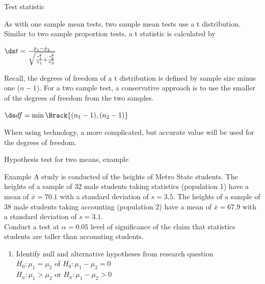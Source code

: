 \documentclass[xcolor=table, handout]{beamer}
\begin{document}
\begin{frame}{Test statistic}
\begin{block}{}
\large
As with one sample mean tests, two sample mean tests use a t distribution. Similar to two sample proportion tests, a t statistic  is calculated by\\
\medskip
{\centering $\ds t = \frac {\bar x_1 - \bar x_2}{\sqrt{\frac{s_1^2}{n_1} + \frac{s_2^2}{n_2}}}$ \par}
\medskip\pause
Recall, the degrees of freedom of a t distribution is defined by sample size minus one ($n-1$). For a two sample test, a conservative approach is to use the smaller of the degrees of freedom from the two samples.\\
\medskip
{\centering $\ds df = \min\Brack{(n_1-1) , (n_2-1)}$ \par}
\pause\medskip
When using technology, a more complicated, but accurate value will be used for the degrees of freedom.
\end{block}
\end{frame}

\begin{frame}{Hypothesis test for two means, example}
\begin{exampleblock}{Example}
\large
A study is conducted of the heights of Metro State students. The heights of a sample of 32 male students taking statistics (population 1) have a mean of $\bar x = 70.1$ with a standard deviation of $s=3.5$. The heights of a sample of 38 male students taking accounting (population 2) have a mean of $\bar x = 67.9$ with a standard deviation of $s=3.1$.\\
\medskip
Conduct a test at $\alpha=0.05$ level of significance of the claim that statistics students are taller than accounting students.
\begin{enumerate}
\pause\item Identify null and alternative hypotheses from research question\\
\pause$H_0: \mu_1 = \mu_2$ of $H_0: \mu_1 - \mu_2 = 0$\\
$H_a: \mu_1 > \mu_2$ or $H_a: \mu_1 - \mu_2 > 0$\\
\end{enumerate}
\end{exampleblock}
\end{frame}
\end{document}
